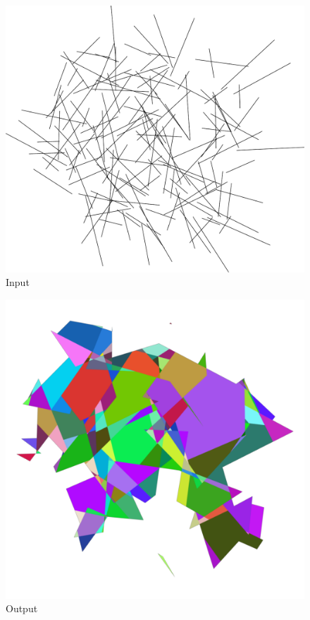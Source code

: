 \vfill

\begin{figure}[p!]
    \includegraphics[width=\textwidth]{./img/test-lines.pdf}%
    \caption{Input}
\end{figure}


\begin{figure}[p!]
    \includegraphics[width=\textwidth]{./img/test-lines-out-compact.pdf}%
    \caption{Output}
\end{figure}

